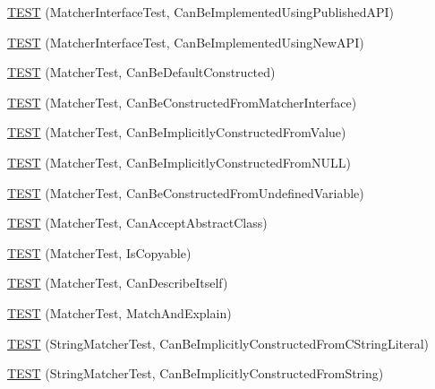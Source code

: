 \begin{DoxyCompactItemize}
\item 
\mbox{\hyperlink{namespacetesting_1_1gmock__matchers__test_a2d73acaddb6b28a827ce0e475ffc9cde}{T\+E\+ST}} (Matcher\+Interface\+Test, Can\+Be\+Implemented\+Using\+Published\+A\+PI)
\item 
\mbox{\hyperlink{namespacetesting_1_1gmock__matchers__test_ad212c5ac3ef7a102a6b1712e40e06a1e}{T\+E\+ST}} (Matcher\+Interface\+Test, Can\+Be\+Implemented\+Using\+New\+A\+PI)
\item 
\mbox{\hyperlink{namespacetesting_1_1gmock__matchers__test_a8843a1545b9e09d73b565cf94f2e5f8b}{T\+E\+ST}} (Matcher\+Test, Can\+Be\+Default\+Constructed)
\item 
\mbox{\hyperlink{namespacetesting_1_1gmock__matchers__test_a3dee288df7e811f817850a5187c42669}{T\+E\+ST}} (Matcher\+Test, Can\+Be\+Constructed\+From\+Matcher\+Interface)
\item 
\mbox{\hyperlink{namespacetesting_1_1gmock__matchers__test_a2bd9ad37a8b9f03b10a15ed322c3249c}{T\+E\+ST}} (Matcher\+Test, Can\+Be\+Implicitly\+Constructed\+From\+Value)
\item 
\mbox{\hyperlink{namespacetesting_1_1gmock__matchers__test_a0de94b029c8a13180276e411f4d75f7f}{T\+E\+ST}} (Matcher\+Test, Can\+Be\+Implicitly\+Constructed\+From\+N\+U\+LL)
\item 
\mbox{\hyperlink{namespacetesting_1_1gmock__matchers__test_a014dc1cd18e74ed71db5b407972e6f50}{T\+E\+ST}} (Matcher\+Test, Can\+Be\+Constructed\+From\+Undefined\+Variable)
\item 
\mbox{\hyperlink{namespacetesting_1_1gmock__matchers__test_a3904607b2566bd4daaec8fa3f5ce1d6e}{T\+E\+ST}} (Matcher\+Test, Can\+Accept\+Abstract\+Class)
\item 
\mbox{\hyperlink{namespacetesting_1_1gmock__matchers__test_ab37bd0e535503a8f39e34b0554b2fb28}{T\+E\+ST}} (Matcher\+Test, Is\+Copyable)
\item 
\mbox{\hyperlink{namespacetesting_1_1gmock__matchers__test_ae85f2ec21822e884ac9ff58741d420d2}{T\+E\+ST}} (Matcher\+Test, Can\+Describe\+Itself)
\item 
\mbox{\hyperlink{namespacetesting_1_1gmock__matchers__test_aee6cef32b22ddd6ce8b87578c3de4198}{T\+E\+ST}} (Matcher\+Test, Match\+And\+Explain)
\item 
\mbox{\hyperlink{namespacetesting_1_1gmock__matchers__test_a17fb479932a88dc4e334327c5e12c8d6}{T\+E\+ST}} (String\+Matcher\+Test, Can\+Be\+Implicitly\+Constructed\+From\+C\+String\+Literal)
\item 
\mbox{\hyperlink{namespacetesting_1_1gmock__matchers__test_a6786eca17f1fc4d6250470cc21ec79f1}{T\+E\+ST}} (String\+Matcher\+Test, Can\+Be\+Implicitly\+Constructed\+From\+String)

\end{DoxyCompactItemize}
